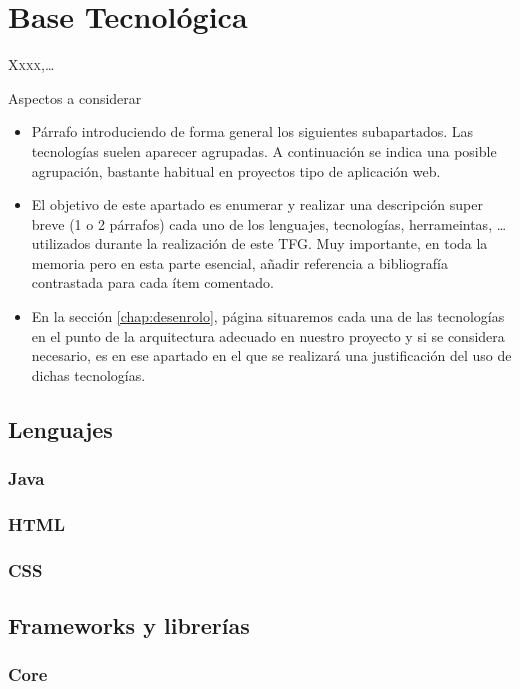 \chapter{Base Tecnológica}
\label{chap:basetecnoloxica}

\lettrine{X}{xxx},\dots

{ \color{red} Aspectos a considerar
    \begin{itemize}
      \item Párrafo introduciendo de forma general los siguientes subapartados. Las tecnologías suelen aparecer agrupadas. A continuación se indica una posible agrupación, bastante habitual en proyectos tipo de aplicación web.
      \item El objetivo de este apartado es enumerar y realizar una descripción super breve (1 o 2 párrafos) cada uno de los lenguajes, tecnologías, herrameintas, \dots utilizados durante la realización de este TFG. Muy importante, en toda la memoria pero en esta parte esencial, añadir referencia a bibliografía contrastada para cada ítem comentado.
      \item En la sección \ref{chap:desenrolo}, página \pageref{chap:desenrolo} situaremos cada una de las tecnologías en el punto de la arquitectura adecuado en nuestro proyecto y si se considera necesario, es en ese apartado en el que se realizará una justificación del uso de dichas tecnologías.
    \end{itemize}
}

\section{Lenguajes}
\label{sec:linguaxes}

\subsection{Java}
\subsection{HTML}
\subsection{CSS}

\section{Frameworks y librerías}
\label{sec:frameworks}

\subsection{Core}
